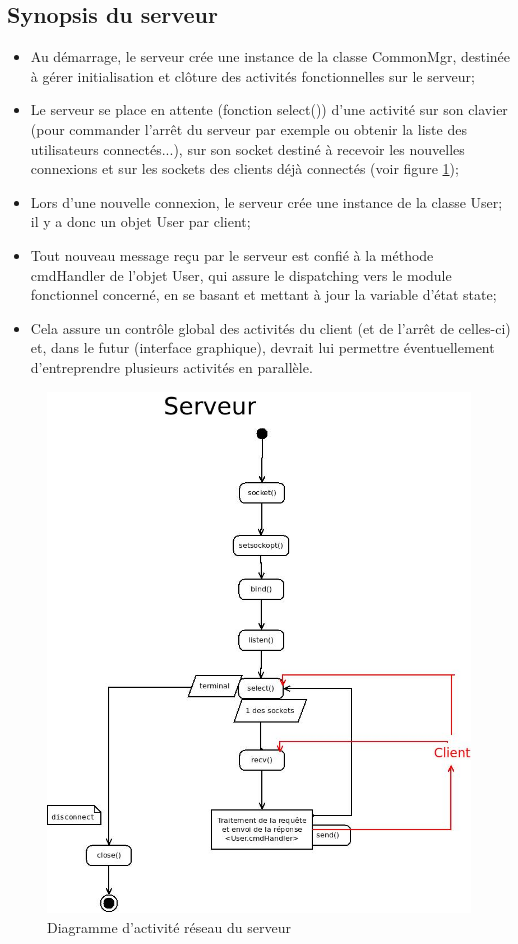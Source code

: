 \documentclass[a4paper,titlepage]{scrreprt}
\begin{document}
\subsection{Synopsis du serveur}
\begin{itemize}
  \item Au démarrage, le serveur crée une instance de la classe CommonMgr, destinée à gérer initialisation et clôture des activités fonctionnelles sur le serveur;
  \item Le serveur se place en attente (fonction select()) d'une activité sur son clavier
  (pour commander l'arrêt du serveur par exemple ou obtenir la liste des utilisateurs connectés...), sur
  son socket destiné à recevoir les nouvelles connexions et sur les sockets des clients déjà connectés (voir figure \ref{diag-serveur});
  \item Lors d'une nouvelle connexion, le serveur crée une instance de la classe User; il y a donc un objet User par client;
  \item Tout nouveau message reçu par le serveur est confié à la méthode cmdHandler de l'objet User, qui assure le dispatching
  vers le module fonctionnel concerné, en se basant et mettant à jour la variable d'état state;
  \item Cela assure un contrôle global des activités du client (et de l'arrêt de celles-ci) et,
  dans le futur (interface graphique), devrait lui permettre éventuellement d'entreprendre plusieurs activités en parallèle.
\end{itemize}
    \begin{figure}[H]
    \center
    \includegraphics[scale=0.4]{uml/Serveur.jpeg}
    \caption{Diagramme d'activité réseau du serveur} \label{diag-serveur}
    \end{figure}
\end{document}
